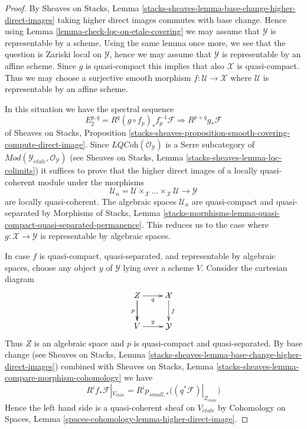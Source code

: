 \begin{proof}
By
Sheaves on Stacks, Lemma
\ref{stacks-sheaves-lemma-base-change-higher-direct-images}
taking higher direct images commutes with base change.
Hence using
Lemma \ref{lemma-check-lqc-on-etale-covering}
we may assume that $\mathcal{Y}$ is representable by a scheme.
Using the same lemma once more, we see that
the question is Zariski local on $\mathcal{Y}$, hence we may assume that
$\mathcal{Y}$ is representable by an affine scheme. Since $g$ is
quasi-compact this implies that also $\mathcal{X}$ is quasi-compact.
Thus we may choose a surjective smooth morphism
$f : \mathcal{U} \to \mathcal{X}$ where $\mathcal{U}$ is representable
by an affine scheme.

\medskip\noindent
In this situation we have the spectral sequence
$$
E_2^{p, q} = R^q(g \circ f_p)_*f_p^{-1}\mathcal{F}
\Rightarrow
R^{p + q}g_*\mathcal{F}
$$
of
Sheaves on Stacks, Proposition
\ref{stacks-sheaves-proposition-smooth-covering-compute-direct-image}.
Since $\textit{LQCoh}(\mathcal{O}_\mathcal{Y})$ is a Serre subcategory
of
$\textit{Mod}(\mathcal{Y}_{\acute{e}tale}, \mathcal{O}_\mathcal{Y})$
(see
Sheaves on Stacks, Lemma \ref{stacks-sheaves-lemma-lqc-colimits})
it suffices to prove that the higher direct images of a locally
quasi-coherent module under the morphisms
$$
\mathcal{U}_n =
\mathcal{U} \times_\mathcal{X} \ldots \times_\mathcal{X} \mathcal{U}
\longrightarrow
\mathcal{Y}
$$
are locally quasi-coherent. The algebraic spaces $\mathcal{U}_n$
are quasi-compact and quasi-separated by
Morphisms of Stacks, Lemma
\ref{stacks-morphisms-lemma-quasi-compact-quasi-separated-permanence}.
This reduces us to the case where $g : \mathcal{X} \to \mathcal{Y}$
is representable by algebraic spaces.

\medskip\noindent
In case $f$ is quasi-compact, quasi-separated, and representable by algebraic
spaces, choose any object $y$ of $\mathcal{Y}$ lying over a scheme $V$.
Consider the cartesian diagram
$$
\xymatrix{
Z \ar[d] \ar[r]_q \ar[d]_p & \mathcal{X} \ar[d]^f \\
V \ar[r]^y & \mathcal{Y}
}
$$
Thus $Z$ is an algebraic space and $p$ is quasi-compact and quasi-separated.
By base change (see
Sheaves on Stacks, Lemma
\ref{stacks-sheaves-lemma-base-change-higher-direct-images})
combined with
Sheaves on Stacks, Lemma \ref{stacks-sheaves-lemma-compare-morphism-cohomology}
we have
$$
R^if_*\mathcal{F}|_{V_{\acute{e}tale}} =
R^ip_{small, *}\big((q^*\mathcal{F})|_{Z_{\acute{e}tale}}\big)
$$
Hence the left hand side is a quasi-coherent sheaf on $V_{\acute{e}tale}$
by Cohomology on Spaces, Lemma
\ref{spaces-cohomology-lemma-higher-direct-image}.
\end{proof}



















